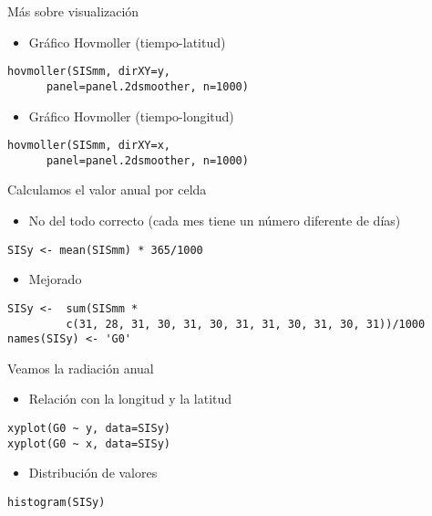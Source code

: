 \documentclass[xcolor={usenames,svgnames,dvipsnames}]{beamer}
\begin{document}
\begin{frame}[fragile,label=sec-2-5]{Más sobre visualización}
 \begin{itemize}
\item Gráfico Hovmoller (tiempo-latitud)
\end{itemize}
\lstset{language=R,numbers=none}
\begin{lstlisting}
hovmoller(SISmm, dirXY=y,
	  panel=panel.2dsmoother, n=1000)
\end{lstlisting}
\begin{itemize}
\item Gráfico Hovmoller (tiempo-longitud)
\end{itemize}
\lstset{language=R,numbers=none}
\begin{lstlisting}
hovmoller(SISmm, dirXY=x,
	  panel=panel.2dsmoother, n=1000)
\end{lstlisting}
\end{frame}
\begin{frame}[fragile,label=sec-2-6]{Calculamos el valor anual por celda}
 \begin{itemize}
\item No del todo correcto (cada mes tiene un número diferente de días)
\end{itemize}
\lstset{language=R,numbers=none}
\begin{lstlisting}
SISy <- mean(SISmm) * 365/1000
\end{lstlisting}
\begin{itemize}
\item Mejorado
\end{itemize}
\lstset{language=R,numbers=none}
\begin{lstlisting}
SISy <-  sum(SISmm *
	     c(31, 28, 31, 30, 31, 30, 31, 31, 30, 31, 30, 31))/1000
names(SISy) <- 'G0'
\end{lstlisting}
\end{frame}

\begin{frame}[fragile,label=sec-2-7]{Veamos la radiación anual}
 \begin{itemize}
\item Relación con la longitud y la latitud
\end{itemize}
\lstset{language=R,numbers=none}
\begin{lstlisting}
xyplot(G0 ~ y, data=SISy)
xyplot(G0 ~ x, data=SISy)
\end{lstlisting}
\begin{itemize}
\item Distribución de valores
\end{itemize}
\lstset{language=R,numbers=none}
\begin{lstlisting}
histogram(SISy)
\end{lstlisting}
\end{frame}
\end{document}
